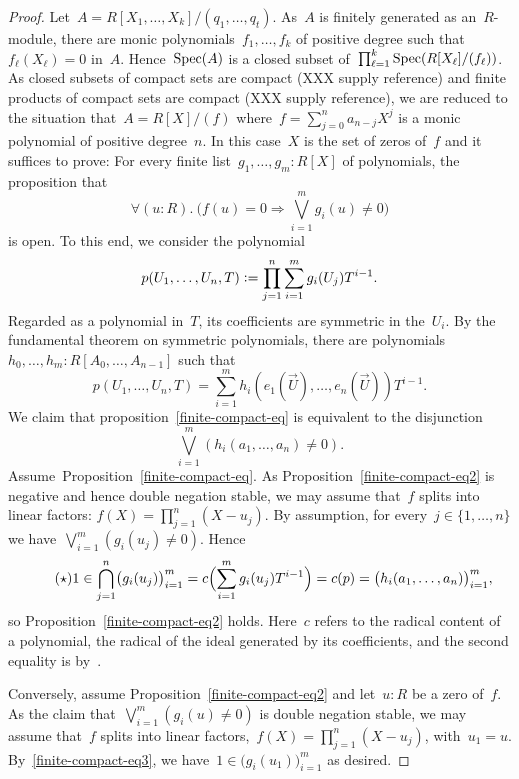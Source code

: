 \begin{proof}Let~$A = R[X_1,\ldots,X_k]/(q_1,\ldots,q_t)$. As~$A$ is finitely
generated as an~$R$-module, there are monic polynomials~$f_1,\ldots,f_k$ of
positive degree such that~$f_\ell(X_\ell) = 0$ in~$A$. Hence~$\operatorname{Spec}(A)$ is a
closed subset of~$\prod_{\ell=1}^k \operatorname{Spec}(R[X_\ell]/(f_\ell))$. As closed
subsets of compact sets are compact (XXX supply reference) and finite products
of compact sets are compact (XXX supply reference), we are reduced to the
situation that~$A = R[X]/(f)$ where~$f = \sum_{j=0}^n a_{n-j} X^j$ is a monic
polynomial of positive degree~$n$. In this case~$X$ is the set of zeros of~$f$
and it suffices to prove: For every finite list~$g_1,\ldots,g_m : R[X]$ of
polynomials, the proposition that
\begin{equation}\label{finite-compact-eq}
  \tag{$\dagger$}
  \forall(u : R).\ \bigl(f(u) = 0 \Rightarrow \bigvee_{i=1}^m g_i(u) \neq 0\bigr)
\end{equation}
is open. To this end, we consider the polynomial
\[ p(U_1,\ldots,U_n,T) \vcentcolon= \prod_{j=1}^n \sum_{i=1}^m g_i(U_j) T^{i-1}. \]
Regarded as a polynomial in~$T$, its coefficients are symmetric in the~$U_i$.
By the fundamental theorem on symmetric polynomials, there are
polynomials~$h_0,\ldots,h_m : R[A_0,\ldots,A_{n-1}]$ such that
\[ p(U_1,\ldots,U_n,T) = \sum_{i=1}^m h_i(e_1(\vec U),\ldots,e_n(\vec U)) T^{i-1}. \]
We claim that proposition~\eqref{finite-compact-eq} is equivalent to the
disjunction
\begin{equation}\label{finite-compact-eq2}
  \tag{$\ddagger$}
  \bigvee_{i=1}^m (h_i(a_1,\ldots,a_n) \neq 0).
\end{equation}
Assume~Proposition~\eqref{finite-compact-eq}. As
Proposition~\eqref{finite-compact-eq2} is negative and hence double
negation stable, we may assume that~$f$ splits into linear factors: $f(X) =
\prod_{j=1}^n (X-u_j)$. By assumption, for every~$j \in \{1,\ldots,n\}$ we
have~$\bigvee_{i=1}^m (g_i(u_j) \neq 0)$. Hence
\begin{equation}\label{finite-compact-eq3}
  \tag{$\star$}
  1 \in \bigcap_{j=1}^n \bigl(g_i(u_j)\bigr)_{i=1}^m = c\Bigl(\sum_{i=1}^m g_i(u_j) T^{i-1}\Bigr) =
  c(p) = \bigl(h_i(a_1,\ldots,a_n)\bigr)_{i=1}^m,
\end{equation}
so Proposition~\eqref{finite-compact-eq2} holds. Here~$c$ refers to the radical
content of a polynomial, the radical of the ideal generated by its
coefficients, and the second equality is
by~\cite[Proposition~1]{banaschewski-vermeulen:radical}.

Conversely, assume Proposition~\eqref{finite-compact-eq2} and let~$u : R$ be a
zero of~$f$. As the claim that~$\bigvee_{i=1}^m (g_i(u) \neq 0)$ is double
negation stable, we may assume that~$f$ splits into linear factors,~$f(X) =
\prod_{j=1}^n (X-u_j)$, with~$u_1 = u$. By~\eqref{finite-compact-eq3}, we
have~$1 \in \bigl(g_i(u_1)\bigr)_{i=1}^m$ as desired.
\end{proof}
